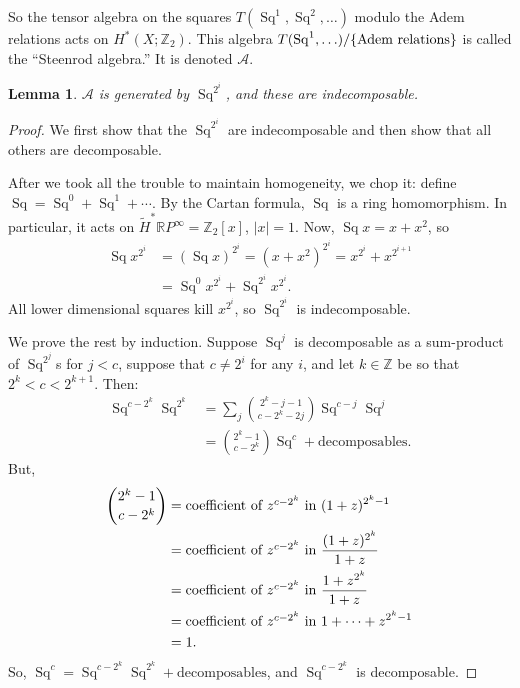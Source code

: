 \documentclass{article}
\newcommand{\Z}{\mathbb{Z}}
\newcommand{\R}{\mathbb{R}}
\newcommand{\RP}{\R P}
\newcommand{\SA}{\mathcal{A}}
\DeclareMathOperator{\Sq}{Sq}
\newtheorem{lem}[thm]{Lemma}
\theoremstyle{definition}
\begin{document}
So the tensor algebra on the squares $T(\Sq^1, \Sq^2, \ldots)$ modulo the Adem relations acts on $H^*(X; \Z_2)$.  This algebra $T(\Sq^1, \ldots) / \{\hbox{Adem relations}\}$ is called the ``Steenrod algebra.''  It is denoted $\SA$.
\begin{lem}
$\SA$ is generated by $\Sq^{2^i}$, and these are indecomposable.
\end{lem}
\begin{proof}
We first show that the $\Sq^{2^i}$ are indecomposable and then show that all others are decomposable.

After we took all the trouble to maintain homogeneity, we chop it: define $\Sq = \Sq^0 + \Sq^1 + \cdots$.  By the Cartan formula, $\Sq$ is a ring homomorphism.  In particular, it acts on $\widetilde H^* \RP^\infty = \Z_2[x]$, $|x| = 1$.  Now, $\Sq x = x + x^2$, so
\begin{align*}
\Sq x^{2^i} & = (\Sq x)^{2^i} = (x + x^2)^{2^i} = x^{2^i} + x^{2^{i+1}} \\
& = \Sq^0 x^{2^i} + \Sq^{2^i} x^{2^i}.
\end{align*}
All lower dimensional squares kill $x^{2^i}$, so $\Sq^{2^i}$ is indecomposable.

We prove the rest by induction.  Suppose $\Sq^j$ is decomposable as a sum-product of $\Sq^{2^j}$s for $j < c$, suppose that $c \ne 2^i$ for any $i$, and let $k \in \Z$ be so that $2^k < c < 2^{k+1}$.  Then:
\begin{align*}
\Sq^{c-2^k} \Sq^{2^k} & = \sum_j \binom{2^k - j - 1}{c-2^k-2j} \Sq^{c-j}\Sq^j \\
& = \binom{2^k - 1}{c-2^k} \Sq^c + \mathrm{decomposables}.
\end{align*}
But,
\begin{align*}
\binom{2^k-1}{c-2^k} & = \hbox{coefficient of $z^{c-2^k}$ in}\ (1 + z)^{2^k-1} \\
& = \hbox{coefficient of $z^{c-2^k}$ in}\ \frac{(1+z)^{2^k}}{1+z} \\
& = \hbox{coefficient of $z^{c-2^k}$ in}\ \frac{1 + z^{2^k}}{1+z} \\
& = \hbox{coefficient of $z^{c-2^k}$ in}\ 1 + \cdots + z^{2^k - 1} \\
& = 1.
\end{align*}
So, $\Sq^c = \Sq^{c-2^k} \Sq^{2^k} + \mathrm{decomposables}$, and $\Sq^{c - 2^k}$ is decomposable.
\end{proof}
\end{document}
